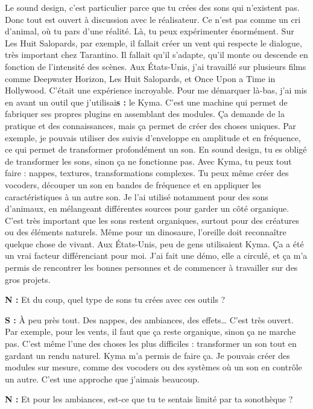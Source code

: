 ﻿\documentclass[12pt]{article}
\begin{document}
Le sound design, c’est particulier parce que tu crées des sons qui n’existent pas. Donc tout est ouvert à discussion avec le réalisateur. Ce n’est pas comme un cri d’animal, où tu pars d’une réalité. Là, tu peux expérimenter énormément.
Sur Les Huit Salopards, par exemple, il fallait créer un vent qui respecte le dialogue, très important chez Tarantino. Il fallait qu’il s’adapte, qu’il monte ou descende en fonction de l’intensité des scènes.
Aux États-Unis, j’ai travaillé sur plusieurs films comme Deepwater Horizon, Les Huit Salopards, et Once Upon a Time in Hollywood. C’était une expérience incroyable.
Pour me démarquer là-bas, j’ai mis en avant un outil que j’utilisai\textbf{s :} le Kyma. C’est une machine qui permet de fabriquer ses propres plugins en assemblant des modules. Ça demande de la pratique et des connaissances, mais ça permet de créer des choses uniques.
Par exemple, je pouvais utiliser des suivis d’enveloppe en amplitude et en fréquence, ce qui permet de transformer profondément un son. En sound design, tu es obligé de transformer les sons, sinon ça ne fonctionne pas.
Avec Kyma, tu peux tout faire : nappes, textures, transformations complexes. Tu peux même créer des vocoders, découper un son en bandes de fréquence et en appliquer les caractéristiques à un autre son. Je l’ai utilisé notamment pour des sons d’animaux, en mélangeant différentes sources pour garder un côté organique.
C’est très important que les sons restent organiques, surtout pour des créatures ou des éléments naturels. Même pour un dinosaure, l’oreille doit reconnaître quelque chose de vivant.
Aux États-Unis, peu de gens utilisaient Kyma. Ça a été un vrai facteur différenciant pour moi. J’ai fait une démo, elle a circulé, et ça m’a permis de rencontrer les bonnes personnes et de commencer à travailler sur des gros projets.

\textbf{N :} Et du coup, quel type de sons tu crées avec ces outils ?

\textbf{S :} À peu près tout. Des nappes, des ambiances, des effets… C’est très ouvert. Par exemple, pour les vents, il faut que ça reste organique, sinon ça ne marche pas. C’est même l’une des choses les plus difficiles : transformer un son tout en gardant un rendu naturel.
Kyma m’a permis de faire ça. Je pouvais créer des modules sur mesure, comme des vocoders ou des systèmes où un son en contrôle un autre. C’est une approche que j’aimais beaucoup.

\textbf{N :} Et pour les ambiances, est-ce que tu te sentais limité par ta sonothèque ?
\end{document}
